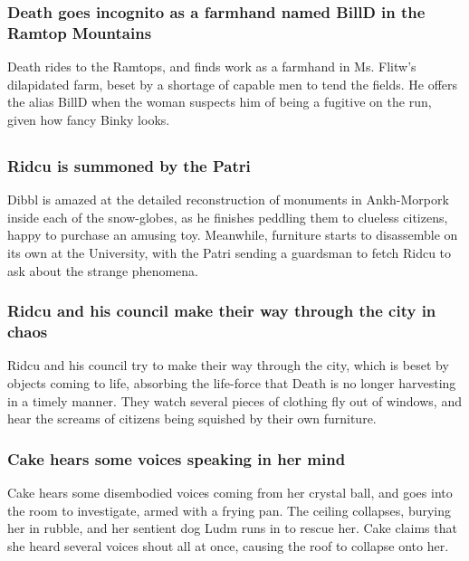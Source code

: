 \subsubsection{\Gls{Death} goes incognito as a farmhand named \Gls{BillD} in the Ramtop Mountains}
\Gls{Death} rides to the Ramtops, and finds work as a farmhand in Ms. \Gls{Flitw}'s dilapidated
farm, beset by a shortage of capable men to tend the fields. He offers the alias \Gls{BillD} when
the woman suspects him of being a fugitive on the run, given how fancy \Gls{Binky} looks.

\subsection{}
\subsubsection{\Gls{Ridcu} is summoned by the \Gls{Patri}}
\Gls{Dibbl} is amazed at the detailed reconstruction of monuments in Ankh-Morpork inside each of
the snow-globes, as he finishes peddling them to clueless citizens, happy to purchase an amusing
toy. Meanwhile, furniture starts to disassemble on its own at the University, with the \Gls{Patri}
sending a guardsman to fetch \Gls{Ridcu} to ask about the strange phenomena.

\subsubsection{\Gls{Ridcu} and his council make their way through the city in chaos}
\Gls{Ridcu} and his council try to make their way through the city, which is beset by objects coming
to life, absorbing the life-force that \Gls{Death} is no longer harvesting in a timely manner. They
watch several pieces of clothing fly out of windows, and hear the screams of citizens being
squished by their own furniture.

\subsubsection{\Gls{Cake} hears some voices speaking in her mind}
\Gls{Cake} hears some disembodied voices coming from her crystal ball, and goes into the room to
investigate, armed with a frying pan. The ceiling collapses, burying her in rubble, and her sentient
dog \Gls{Ludm} runs in to rescue her. \Gls{Cake} claims that she heard several voices shout all at
once, causing the roof to collapse onto her.

